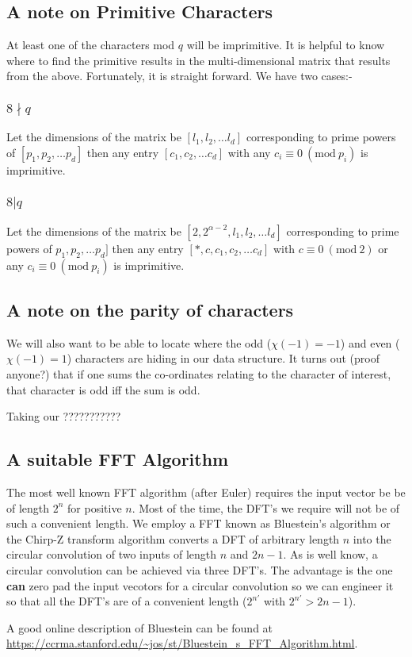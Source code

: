 \documentclass[12pt]{amsart}
\newcommand{\Mod}[1]{\ (\mathrm{mod}\ #1)}
\theoremstyle{remark}
\numberwithin{theorem}{section}
\numberwithin{equation}{section}
\begin{document}
\subsection{A note on Primitive Characters}

At least one of the characters mod $q$ will be imprimitive. It is helpful to know where to find the primitive results in the multi-dimensional matrix that results from the above. Fortunately, it is straight forward. We have two cases:-


\subsubsection{$8\nmid q$}

Let the dimensions of the matrix be $[l_1,l_2,\ldots l_d]$ corresponding to prime powers of $[p_1,p_2,\ldots p_d]$ then any entry $[c_1,c_2,\ldots c_d]$ with any $c_i\equiv 0 \Mod{p_i}$ is imprimitive.

\subsubsection{$8 | q$}

Let the dimensions of the matrix be $[2,2^{\alpha-2},l_1,l_2,\ldots l_d]$ corresponding to prime powers of $p_1,p_2,\ldots p_d]$ then any entry $[*,c,c_1,c_2,\ldots c_d]$ with $c\equiv 0 \Mod{2}$ or any $c_i\equiv 0 \Mod{p_i}$ is imprimitive.

\subsection{A note on the parity of characters}

We will also want to be able to locate where the odd ($\chi(-1)=-1$) and even ($\chi(-1)=1$) characters are hiding in our data structure. It turns out (proof anyone?) that if one sums the co-ordinates relating to the character of interest, that character is odd iff the sum is odd.  

Taking our ???????????
\subsection{A suitable FFT Algorithm}

The most well known FFT algorithm (after Euler) requires the input vector be be of length $2^n$ for positive $n$. Most of the time, the DFT's we require will not be of such a convenient length. We employ a FFT known as Bluestein's algorithm or the Chirp-Z transform algorithm converts a DFT of arbitrary length $n$ into the circular convolution of two inputs of length $n$ and $2n-1$. As is well know, a circular convolution can be achieved via three DFT's. The advantage is the one \textbf{can} zero pad the input vecotors for a circular convolution so we can engineer it so that all the DFT's are of a convenient length ($2^{n'}$ with $2^{n'}>2n-1$).

A good online description of Bluestein can be found at \url{https://ccrma.stanford.edu/~jos/st/Bluestein_s_FFT_Algorithm.html}.



\end{document}
